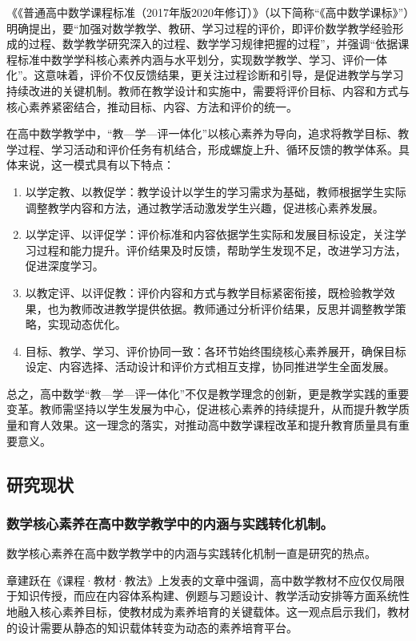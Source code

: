 \documentclass[UTF8,a4paper,12pt,twoside]{ctexart}
\begin{document}
《《普通高中数学课程标准（2017年版2020年修订）》（以下简称“《高中数学课标》”）明确提出，要“加强对数学教学、教研、学习过程的评价，即评价数学教学经验形成的过程、数学教学研究深入的过程、数学学习规律把握的过程”，并强调“依据课程标准中数学学科核心素养内涵与水平划分，实现数学教学、学习、评价一体化”。这意味着，评价不仅反馈结果，更关注过程诊断和引导，是促进教学与学习持续改进的关键机制。教师在教学设计和实施中，需要将评价目标、内容和方式与核心素养紧密结合，推动目标、内容、方法和评价的统一。

在高中数学教学中，“教—学—评一体化”以核心素养为导向，追求将教学目标、教学过程、学习活动和评价任务有机结合，形成螺旋上升、循环反馈的教学体系。具体来说，这一模式具有以下特点：

\begin{enumerate}
\item 以学定教、以教促学：教学设计以学生的学习需求为基础，教师根据学生实际调整教学内容和方法，通过教学活动激发学生兴趣，促进核心素养发展。
\item 以学定评、以评促学：评价标准和内容依据学生实际和发展目标设定，关注学习过程和能力提升。评价结果及时反馈，帮助学生发现不足，改进学习方法，促进深度学习。
\item 以教定评、以评促教：评价内容和方式与教学目标紧密衔接，既检验教学效果，也为教师改进教学提供依据。教师通过分析评价结果，反思并调整教学策略，实现动态优化。
\item 目标、教学、学习、评价协同一致：各环节始终围绕核心素养展开，确保目标设定、内容选择、活动设计和评价方式相互支撑，协同推进学生全面发展。
\end{enumerate}

总之，高中数学“教—学—评一体化”不仅是教学理念的创新，更是教学实践的重要变革。教师需坚持以学生发展为中心，促进核心素养的持续提升，从而提升教学质量和育人效果。这一理念的落实，对推动高中数学课程改革和提升教育质量具有重要意义。

\subsection{研究现状}

\subsubsection{数学核心素养在高中数学教学中的内涵与实践转化机制。}
数学核心素养在高中数学教学中的内涵与实践转化机制一直是研究的热点。

章建跃\cite{zhang2016}在《课程·教材·教法》上发表的文章中强调，高中数学教材不应仅仅局限于知识传授，而应在内容体系构建、例题与习题设计、教学活动安排等方面系统性地融入核心素养目标，使教材成为素养培育的关键载体。这一观点启示我们，教材的设计需要从静态的知识载体转变为动态的素养培育平台。
\end{document}
